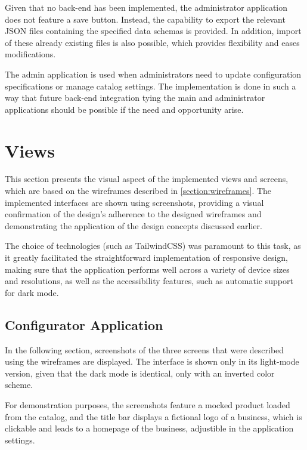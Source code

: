Given that no back-end has been implemented, the administrator application does not feature a save button. Instead, the capability to export the relevant JSON files containing the specified data schemas is provided. In addition, import of these already existing files is also possible, which provides flexibility and eases modifications.

The admin application is used when administrators need to update configuration specifications or manage catalog settings. The implementation is done in such a way that future back-end integration tying the main and administrator applications should be possible if the need and opportunity arise.


\section{Views}

This section presents the visual aspect of the implemented views and screens, which are based on the wireframes described in \autoref{section:wireframes}. The implemented interfaces are shown using screenshots, providing a visual confirmation of the design's adherence to the designed wireframes and demonstrating the application of the design concepts discussed earlier.

The choice of technologies (such as TailwindCSS) was paramount to this task, as it greatly facilitated the straightforward implementation of responsive design, making sure that the application performs well across a variety of device sizes and resolutions, as well as the accessibility features, such as automatic support for dark mode.


\subsection{Configurator Application}

In the following section, screenshots of the three screens that were described using the wireframes are displayed. The interface is shown only in its light-mode version, given that the dark mode is identical, only with an inverted color scheme.

For demonstration purposes, the screenshots feature a mocked product loaded from the catalog, and the title bar displays a fictional logo of a business, which is clickable and leads to a homepage of the business, adjustible in the application settings.  


